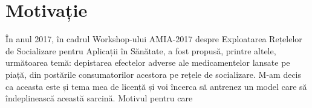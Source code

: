 \chapter*{Motivație} 

În anul 2017, în cadrul Workshop-ului AMIA-2017 despre Exploatarea Rețelelor de Socializare pentru Aplicații în
Sănătate, a fost propusă, printre altele, următoarea temă: depistarea efectelor adverse ale medicamentelor
lansate pe piață, din postările consumatorilor acestora pe rețele de socializare. M-am decis
ca aceasta este și tema mea de licență și voi încerca să antrenez un model care să îndeplinească această sarcină.
Motivul pentru care 

